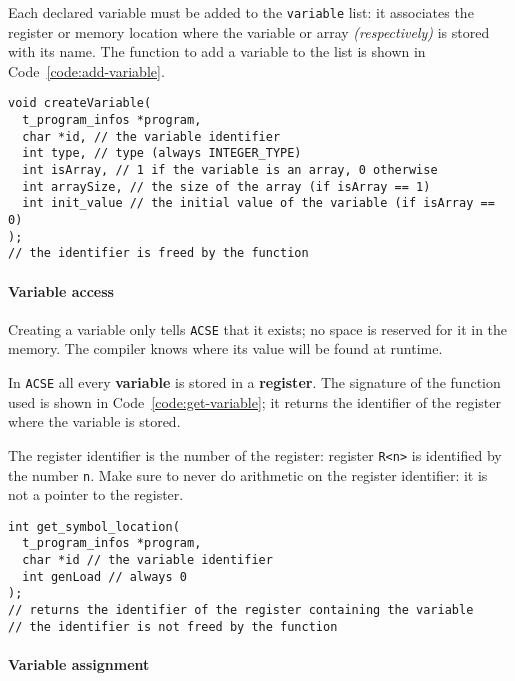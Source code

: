 Each declared variable must be added to the \texttt{variable} list: it associates the register or memory location where the variable or array \textit{(respectively)} is stored with its name.
The function to add a variable to the list is shown in Code~\ref{code:add-variable}.

\begin{onepage}
  \begin{lstlisting}[language=LANCE, caption={Add variable to the list}, label={code:add-variable}]
void createVariable(
  t_program_infos *program,
  char *id, // the variable identifier
  int type, // type (always INTEGER_TYPE)
  int isArray, // 1 if the variable is an array, 0 otherwise
  int arraySize, // the size of the array (if isArray == 1)
  int init_value // the initial value of the variable (if isArray == 0)
);
// the identifier is freed by the function
\end{lstlisting}
\end{onepage}

\paragraph{Variable access}

Creating a variable only tells \texttt{ACSE} that it exists;
no space is reserved for it in the memory.
The compiler knows where its value will be found at runtime.

In \texttt{ACSE} all every \textbf{variable} is stored in a \textbf{register}.
The signature of the function used is shown in Code~\ref{code:get-variable};
it returns the identifier of the register where the variable is stored.

The register identifier is the number of the register: register \texttt{R<n>} is identified by the number \texttt{n}.
Make sure to never do arithmetic on the register identifier: it is not a pointer to the register.

\begin{onepage}
  \begin{lstlisting}[language=LANCE, caption={Get variable from the list}, label={code:get-variable}]
int get_symbol_location(
  t_program_infos *program,
  char *id // the variable identifier
  int genLoad // always 0
);
// returns the identifier of the register containing the variable
// the identifier is not freed by the function
\end{lstlisting}
\end{onepage}

\paragraph{Variable assignment}

